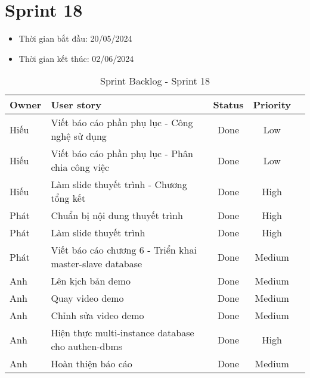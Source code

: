 \section{Sprint 18}
\begin{itemize}
    \item Thời gian bắt đầu: 20/05/2024
    \item Thời gian kết thúc: 02/06/2024
\end{itemize}
\begin{table}[H]
    \begin{tabular}{|m{2.5cm}|m{9cm}|c|c|c|}
    \hline
    \textbf{Owner}  & \textbf{User story}                                & \textbf{Status}  & \textbf{Priority} \\ \hline
    Hiếu                & Viết báo cáo phần phụ lục - Công nghệ sử dụng                & Done                              & Low        \\ \hline
    Hiếu               & Viết báo cáo phần phụ lục - Phân chia công việc                & Done                              & Low         \\ \hline
    Hiếu                & Làm slide thuyết trình  - Chương tổng kết                  & Done                              & High         \\ \hline
    Phát              & Chuẩn bị nội dung thuyết trình                & Done                              & High         \\ \hline
    Phát               & Làm slide thuyết trình                 & Done                              & High         \\ \hline
    Phát               & Viết báo cáo chương 6 - Triển khai master-slave database               & Done                              & Medium         \\ \hline
    Anh               & Lên kịch bản demo               & Done                              & Medium         \\ \hline
    Anh               & Quay video demo               & Done                              & Medium         \\ \hline
    Anh               & Chỉnh sửa video demo                & Done                              & Medium         \\ \hline
    Anh               & Hiện thực multi-instance database cho authen-dbms                & Done                              & High         \\ \hline
    Anh               & Hoàn thiện báo cáo                & Done                              & Medium         \\ \hline
    \end{tabular}
    \caption{Sprint Backlog - Sprint 18}
    \label{tab:sprint-18}
\end{table}